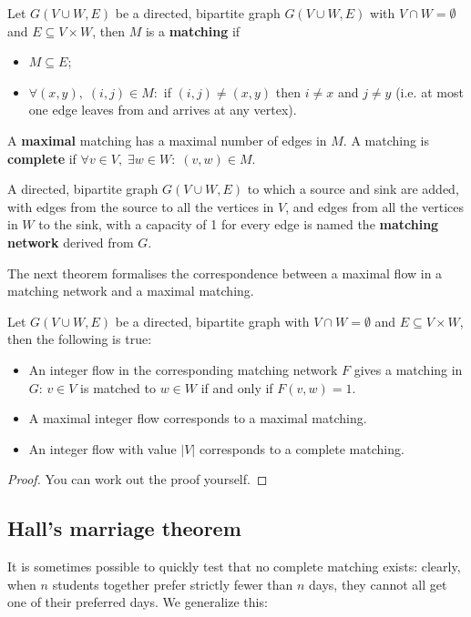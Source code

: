 \begin{definition}
	{\rm Let $G(V \cup W,E)$ be a directed, bipartite graph $G(V \cup
	W,E)$ with $V \cap W = \emptyset$ and $E \subseteq V \times W$, then
	$M$ is a \textbf{matching} if
	\begin{itemize}
		\item $M \subseteq E$;
		\item $\forall (x,y),\;(i,j) \in M:$ if $(i,j) \neq (x,y)$ then $i \neq x$ and $j \neq y$ (i.e. at most one edge leaves from and arrives at any vertex).
	\end{itemize}
	A \textbf{maximal} matching has a maximal number of edges in $M$. A
	matching is \textbf{complete} if $\forall v \in V,\; \exists w\in W:\;
	(v,w) \in M$.  }
\end{definition}

A directed, bipartite graph $G(V \cup W,E)$ to which a source and sink
are added, with edges from the source to all the vertices in $V$, and edges from
all the vertices in $W$ to the sink, with a capacity of 1 for every
edge is named the \textbf{matching network} derived from $G$.


The next theorem formalises the correspondence between a maximal
flow in a matching network and a maximal matching.

 \begin{theorem}
Let $G(V \cup W,E)$ be a directed, bipartite graph
with $V \cap W = \emptyset$ and $E \subseteq V \times W$, then the
following is true:
	\begin{itemize}
		\item An integer flow in the corresponding matching network $F$ gives a
		matching in $G$: $v \in V$ is matched to $w \in W$ if and only if
		$F(v,w) = 1$.
		
		\item A maximal integer flow corresponds to a maximal matching.
		
		\item An integer flow with value $|V|$ corresponds to a complete matching.	
	\end{itemize}
\end{theorem}
\begin{proof}
You can work out the proof yourself.
\end{proof}

\subsection{Hall's marriage theorem}
It is sometimes possible to quickly test that no complete matching
exists: clearly, when $n$ students together prefer strictly fewer than
$n$ days, they cannot all get one of their preferred days. We generalize this:

